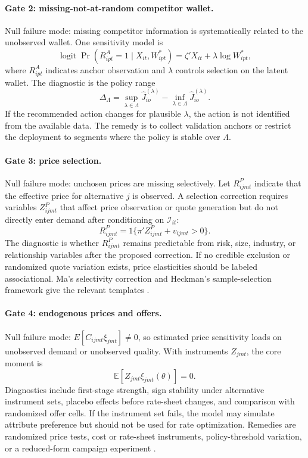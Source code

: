 \documentclass[11pt]{article}
\begin{document}
\paragraph{Gate 2: missing-not-at-random competitor wallet.}
Null failure mode: missing competitor information is systematically related to
the unobserved wallet. One sensitivity model is
\[
  \operatorname{logit}\Pr(R_{ipt}^{A}=1\mid X_{it},W_{ipt}^{*})
  =
  \zeta'X_{it}+\lambda\log W_{ipt}^{*},
\]
where $R_{ipt}^{A}$ indicates anchor observation and $\lambda$ controls
selection on the latent wallet. The diagnostic is the policy range
\[
  \Delta_{\Lambda}
  =
  \sup_{\lambda\in\Lambda}\widehat{J}_{io}^{(\lambda)}
  -
  \inf_{\lambda\in\Lambda}\widehat{J}_{io}^{(\lambda)}.
\]
If the recommended action changes for plausible $\lambda$, the action is not
identified from the available data. The remedy is to collect validation anchors
or restrict the deployment to segments where the policy is stable over
$\Lambda$.

\paragraph{Gate 3: price selection.}
Null failure mode: unchosen prices are missing selectively. Let $R_{ijmt}^{P}$
indicate that the effective price for alternative $j$ is observed. A selection
correction requires variables $Z_{ijmt}^{P}$ that affect price observation or
quote generation but do not directly enter demand after conditioning on
$\mathcal{I}_{it}$:
\[
  R_{ijmt}^{P}
  =
  1\{\pi'Z_{ijmt}^{P}+v_{ijmt}>0\}.
\]
The diagnostic is whether $R_{ijmt}^{P}$ remains predictable from risk, size,
industry, or relationship variables after the proposed correction. If no
credible exclusion or randomized quote variation exists, price elasticities
should be labeled associational. Ma's selectivity correction and Heckman's
sample-selection framework give the relevant templates
\citep{heckman1979selection,ma2024discrete}.

\paragraph{Gate 4: endogenous prices and offers.}
Null failure mode: $E[C_{ijmt}\xi_{jmt}]\neq0$, so estimated price sensitivity
loads on unobserved demand or unobserved quality. With instruments $Z_{jmt}$,
the core moment is
\[
  \mathbb{E}[Z_{jmt}\xi_{jmt}(\theta)]=0.
\]
Diagnostics include first-stage strength, sign stability under alternative
instrument sets, placebo effects before rate-sheet changes, and comparison with
randomized offer cells. If the instrument set fails, the model may simulate
attribute preference but should not be used for rate optimization. Remedies are
randomized price tests, cost or rate-sheet instruments, policy-threshold
variation, or a reduced-form campaign experiment
\citep{berry1995automobile,dick2008demand}.
\end{document}

